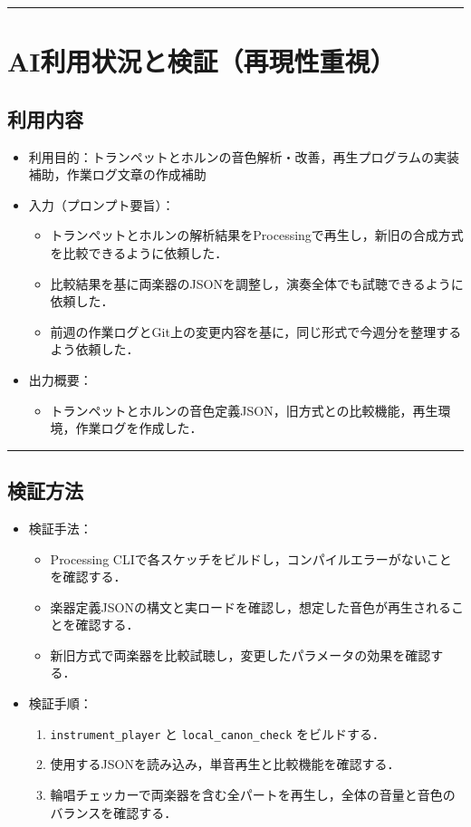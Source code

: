\documentclass[uplatex,dvipdfmx,a4paper,11pt]{jsarticle}
\newcommand{\sectionrule}{\par\medskip\noindent\rule{\linewidth}{0.6pt}\par\medskip}
\begin{document}
\sectionrule

\section{AI利用状況と検証（再現性重視）}

\subsection{利用内容}

\begin{itemize}
  \item 利用目的：トランペットとホルンの音色解析・改善，再生プログラムの実装補助，作業ログ文章の作成補助
  \item 入力（プロンプト要旨）：
    \begin{itemize}
      \item トランペットとホルンの解析結果をProcessingで再生し，新旧の合成方式を比較できるように依頼した．
      \item 比較結果を基に両楽器のJSONを調整し，演奏全体でも試聴できるように依頼した．
      \item 前週の作業ログとGit上の変更内容を基に，同じ形式で今週分を整理するよう依頼した．
    \end{itemize}
  \item 出力概要：
    \begin{itemize}
      \item トランペットとホルンの音色定義JSON，旧方式との比較機能，再生環境，作業ログを作成した．
    \end{itemize}
\end{itemize}

\sectionrule

\subsection{検証方法}

\begin{itemize}
  \item 検証手法：
    \begin{itemize}
      \item Processing CLIで各スケッチをビルドし，コンパイルエラーがないことを確認する．
      \item 楽器定義JSONの構文と実ロードを確認し，想定した音色が再生されることを確認する．
      \item 新旧方式で両楽器を比較試聴し，変更したパラメータの効果を確認する．
    \end{itemize}
  \item 検証手順：
    \begin{enumerate}
      \item \texttt{instrument\_player} と \texttt{local\_canon\_check} をビルドする．
      \item 使用するJSONを読み込み，単音再生と比較機能を確認する．
      \item 輪唱チェッカーで両楽器を含む全パートを再生し，全体の音量と音色のバランスを確認する．
    \end{enumerate}
\end{itemize}
\end{document}
